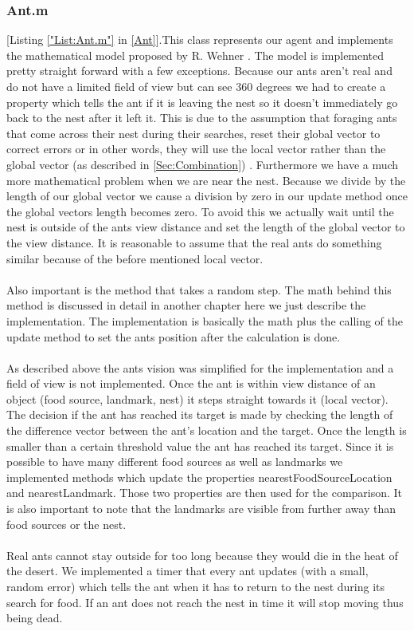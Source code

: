 \documentclass[11pt]{article}
\begin{document}
\subsubsection{Ant.m}
[Listing \ref{"List:Ant.m"} in \ref{Ant}].This class represents our agent and implements the mathematical model proposed by R. Wehner \cite{Wehner1988}. The model is implemented pretty straight forward with a few exceptions. Because
our ants aren't real and do not have a limited field of view but can see 360 degrees we had to create
a property which tells the ant if it is leaving the nest so it doesn't immediately go back to the nest
after it left it. This is due to the assumption that foraging ants that come across their nest during
their searches, reset their global vector to correct errors or in other words, they will use the local
vector rather than the global vector (as described in  \ref{Sec:Combination}) . Furthermore we have a much more mathematical problem
when we are near the nest. Because we divide by the length of our global vector we cause a division
by zero in our update method once the global vectors length becomes zero. To avoid this we
actually wait until the nest is outside of the ants view distance and set the length of the global vector
to the view distance. It is reasonable to assume that the real ants do something similar because of
the before mentioned local vector.\\
\ \\
Also important is the method that takes a random step. The math behind this method is discussed in
detail in another chapter here we just describe the implementation. The implementation is basically
the math plus the calling of the update method to set the ants position after the calculation is done.\\
\ \\
As described above the ants vision was simplified for the implementation and a field of view is not
implemented. Once the ant is within view distance of an object (food source, landmark, nest) it
steps straight towards it (local vector). The decision if the ant has reached its target is made by
checking the length of the difference vector between the ant's location and the target. Once the
length is smaller than a certain threshold value the ant has reached its target. Since it is possible to
have many different food sources as well as landmarks we implemented methods which update the
properties nearestFoodSourceLocation and nearestLandmark. Those two properties are then used
for the comparison. It is also important to note that the landmarks are visible from further away than
food sources or the nest.\\
\ \\
Real ants cannot stay outside for too long because they would die in the heat of the desert. We
implemented a timer that every ant updates (with a small, random error) which tells the ant when it
has to return to the nest during its search for food. If an ant does not reach the nest in time it will
stop moving thus being dead.
\end{document}
